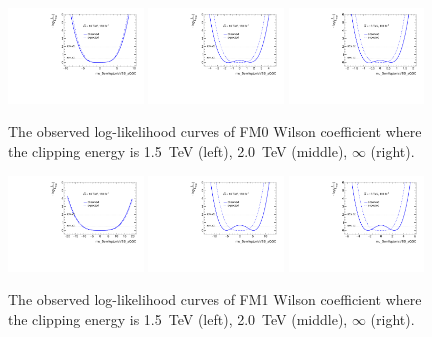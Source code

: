 \begin{figure}[ht]
    \centering
    \includegraphics[width=0.32\textwidth]{figures/aQGC/profileFM01500}
    	\includegraphics[width=0.32\textwidth]{figures/aQGC/profileFM02000}
        \includegraphics[width=0.32\textwidth]{figures/aQGC/profileFM0inf}
        \caption{The observed log-likelihood curves of FM0 Wilson coefficient where the clipping energy is 1.5~TeV (left), 2.0~TeV (middle), $\infty$ (right).}
        \label{fig:ProfileLLFM0}
\end{figure}
\begin{figure}[ht]
    \centering
    \includegraphics[width=0.32\textwidth]{figures/aQGC/profileFM11500}
    	\includegraphics[width=0.32\textwidth]{figures/aQGC/profileFM12000}
        \includegraphics[width=0.32\textwidth]{figures/aQGC/profileFM1inf}
        \caption{The observed log-likelihood curves of FM1 Wilson coefficient where the clipping energy is 1.5~TeV (left), 2.0~TeV (middle), $\infty$ (right).}
        \label{fig:ProfileLLFM1}
\end{figure}
